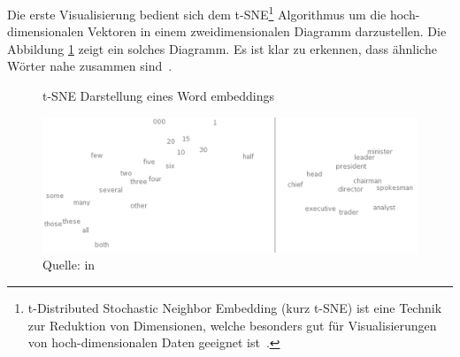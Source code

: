 Die erste Visualisierung bedient sich dem t-SNE\footnote{t-Distributed Stochastic Neighbor Embedding (kurz t-SNE) ist eine Technik zur Reduktion von Dimensionen, welche besonders gut für Visualisierungen von hoch-dimensionalen Daten geeignet ist~\autocite{tSNE}.} Algorithmus um die hoch-dimensionalen Vektoren in einem zweidimensionalen Diagramm darzustellen. Die Abbildung \ref{wordembeddingtsne} zeigt ein solches Diagramm. Es ist klar zu erkennen, dass ähnliche Wörter nahe zusammen sind~\autocite{Olah2014b}.
\begin{figure}[h!]
    \centering
    \captionsetup{width=.9\linewidth}
    \caption{t-SNE Darstellung eines Word embeddings}
    \includegraphics[width=\textwidth]{graphics/wordmebeddingtsne.jpg}
    \caption*{Quelle: \textcite{Turian2010} in \textcite{Olah2014b}}
    \vspace*{0.3cm}
    \label{wordembeddingtsne}
\end{figure}

